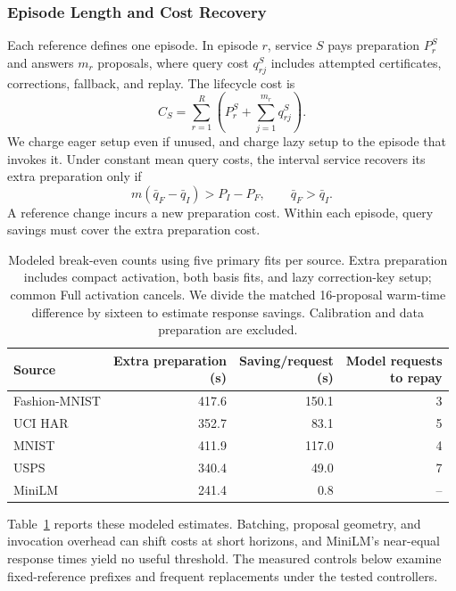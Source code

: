 \documentclass[5p,times,twocolumn]{elsarticle}
\begin{document}
\subsubsection{Episode Length and Cost Recovery}
Each reference defines one episode. In episode $r$, service $S$ pays preparation $P_r^S$ and answers $m_r$ proposals, where query cost $q_{rj}^S$ includes attempted certificates, corrections, fallback, and replay. The lifecycle cost is
\begin{equation}
 C_S=\sum_{r=1}^{R}\left(P_r^S+\sum_{j=1}^{m_r}q_{rj}^S\right).
 \label{eq:revision-episode-cost}
\end{equation}
We charge eager setup even if unused, and charge lazy setup to the episode that invokes it. Under constant mean query costs, the interval service recovers its extra preparation only if
\begin{equation}
 m(\bar q_F-\bar q_I)>P_I-P_F,
 \qquad \bar q_F>\bar q_I.
 \label{eq:revision-breakeven}
\end{equation}
A reference change incurs a new preparation cost. Within each episode, query savings must cover the extra preparation cost.

\begin{table}[!b]
\centering\small
\caption{Modeled break-even counts using five primary fits per source.
Extra preparation includes compact activation, both basis fits, and
lazy correction-key setup; common Full activation cancels. We divide
the matched 16-proposal warm-time difference by sixteen to estimate
response savings. Calibration and data preparation are excluded.}
\label{tab:revision-breakeven}
\setlength{\tabcolsep}{3pt}
\begin{tabular}{@{}lrrr@{}}\toprule
Source & \shortstack{Extra preparation\\(s)} & \shortstack{Saving/request\\(s)} & \shortstack{Model requests\\to repay}\\\midrule
Fashion-MNIST & 417.6 & 150.1 & 3\\
UCI HAR & 352.7 & 83.1 & 5\\
MNIST & 411.9 & 117.0 & 4\\
USPS & 340.4 & 49.0 & 7\\
MiniLM & 241.4 & 0.8 & --\\
\bottomrule\end{tabular}
\end{table}

Table~\ref{tab:revision-breakeven} reports these modeled estimates. Batching, proposal geometry, and invocation overhead can shift costs at short horizons, and MiniLM's near-equal response times yield no useful threshold. The measured controls below examine fixed-reference prefixes and frequent replacements under the tested controllers.
\end{document}
